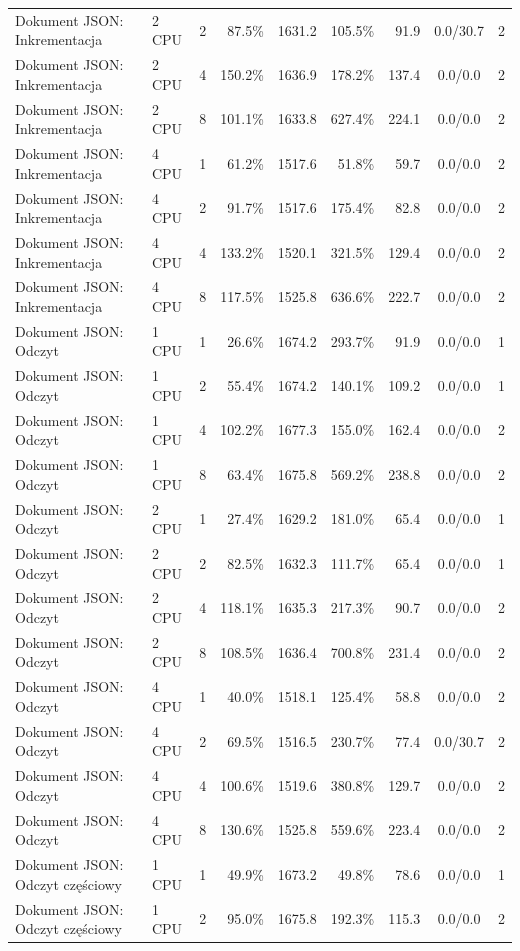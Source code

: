\begin{table}[ht]
{\begin{tabular}{llcrrrrcc}
Dokument JSON: Inkrementacja & 2 CPU & 2 & 87.5\% & 1631.2 & 105.5\% & 91.9 & 0.0/30.7 & 2 \\
Dokument JSON: Inkrementacja & 2 CPU & 4 & 150.2\% & 1636.9 & 178.2\% & 137.4 & 0.0/0.0 & 2 \\
Dokument JSON: Inkrementacja & 2 CPU & 8 & 101.1\% & 1633.8 & 627.4\% & 224.1 & 0.0/0.0 & 2 \\
Dokument JSON: Inkrementacja & 4 CPU & 1 & 61.2\% & 1517.6 & 51.8\% & 59.7 & 0.0/0.0 & 2 \\
Dokument JSON: Inkrementacja & 4 CPU & 2 & 91.7\% & 1517.6 & 175.4\% & 82.8 & 0.0/0.0 & 2 \\
Dokument JSON: Inkrementacja & 4 CPU & 4 & 133.2\% & 1520.1 & 321.5\% & 129.4 & 0.0/0.0 & 2 \\
Dokument JSON: Inkrementacja & 4 CPU & 8 & 117.5\% & 1525.8 & 636.6\% & 222.7 & 0.0/0.0 & 2 \\
Dokument JSON: Odczyt & 1 CPU & 1 & 26.6\% & 1674.2 & 293.7\% & 91.9 & 0.0/0.0 & 1 \\
Dokument JSON: Odczyt & 1 CPU & 2 & 55.4\% & 1674.2 & 140.1\% & 109.2 & 0.0/0.0 & 1 \\
Dokument JSON: Odczyt & 1 CPU & 4 & 102.2\% & 1677.3 & 155.0\% & 162.4 & 0.0/0.0 & 2 \\
Dokument JSON: Odczyt & 1 CPU & 8 & 63.4\% & 1675.8 & 569.2\% & 238.8 & 0.0/0.0 & 2 \\
Dokument JSON: Odczyt & 2 CPU & 1 & 27.4\% & 1629.2 & 181.0\% & 65.4 & 0.0/0.0 & 1 \\
Dokument JSON: Odczyt & 2 CPU & 2 & 82.5\% & 1632.3 & 111.7\% & 65.4 & 0.0/0.0 & 1 \\
Dokument JSON: Odczyt & 2 CPU & 4 & 118.1\% & 1635.3 & 217.3\% & 90.7 & 0.0/0.0 & 2 \\
Dokument JSON: Odczyt & 2 CPU & 8 & 108.5\% & 1636.4 & 700.8\% & 231.4 & 0.0/0.0 & 2 \\
Dokument JSON: Odczyt & 4 CPU & 1 & 40.0\% & 1518.1 & 125.4\% & 58.8 & 0.0/0.0 & 2 \\
Dokument JSON: Odczyt & 4 CPU & 2 & 69.5\% & 1516.5 & 230.7\% & 77.4 & 0.0/30.7 & 2 \\
Dokument JSON: Odczyt & 4 CPU & 4 & 100.6\% & 1519.6 & 380.8\% & 129.7 & 0.0/0.0 & 2 \\
Dokument JSON: Odczyt & 4 CPU & 8 & 130.6\% & 1525.8 & 559.6\% & 223.4 & 0.0/0.0 & 2 \\
Dokument JSON: Odczyt częściowy & 1 CPU & 1 & 49.9\% & 1673.2 & 49.8\% & 78.6 & 0.0/0.0 & 1 \\
Dokument JSON: Odczyt częściowy & 1 CPU & 2 & 95.0\% & 1675.8 & 192.3\% & 115.3 & 0.0/0.0 & 2 \\

\end{tabular}}
\end{table}
